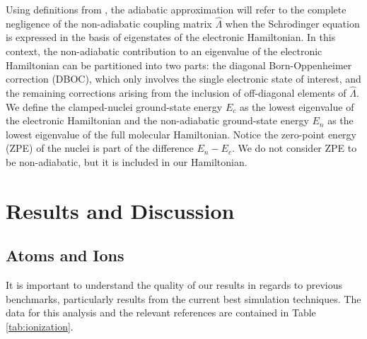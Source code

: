 \documentclass[pra,superscriptaddress,groupedaddress,twocolumn]{revtex4}
\begin{document}
Using definitions from \cite{Cederbaum_Review}, the adiabatic approximation will refer to the complete negligence of the non-adiabatic coupling matrix $\hat{\Lambda}$ when the Schr$\ddot{\text{o}}$dinger equation is expressed in the basis of eigenstates of the electronic Hamiltonian. In this context, the non-adiabatic contribution to an eigenvalue of the electronic Hamiltonian can be partitioned into two parts: the diagonal Born-Oppenheimer correction (DBOC), which only involves the single electronic state of interest, and the remaining corrections arising from the inclusion of off-diagonal elements of $\hat{\Lambda}$. We define the clamped-nuclei ground-state energy $E_c$ as the lowest eigenvalue of the electronic Hamiltonian and the non-adiabatic ground-state energy $E_n$ as the lowest eigenvalue of the full molecular Hamiltonian. Notice the zero-point energy (ZPE) of the nuclei is part of the difference $E_n-E_c$. We do not consider ZPE to be non-adiabatic, but it is included in our Hamiltonian.

\section{Results and Discussion}



\subsection{Atoms and Ions}

It is important to understand the quality of our results in regards to previous benchmarks, particularly results from the current best simulation techniques. The data for this analysis and the relevant references are contained in Table \ref{tab:ionization}. 
\end{document}
